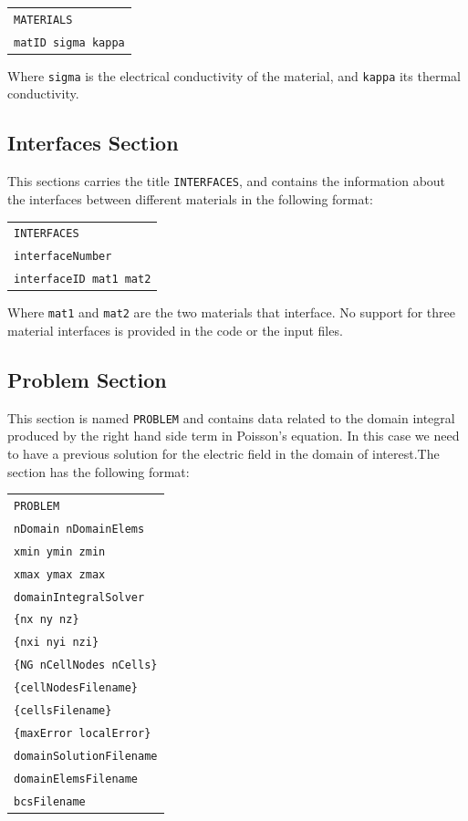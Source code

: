 \documentclass[12pt]{article}
\begin{document}
\begin{tabular}{l}
\texttt{MATERIALS}\\
\texttt{matID sigma kappa}
\end{tabular}

Where \verb+sigma+ is the electrical conductivity of the material, and \verb+kappa+ its thermal conductivity.

\subsection{Interfaces Section}
This sections carries the title \verb+INTERFACES+, and contains the information about the interfaces between different materials in the following format:

\begin{tabular}{l}
\texttt{INTERFACES}\\
\texttt{interfaceNumber}\\
\texttt{interfaceID mat1 mat2}\\
\end{tabular}

Where \verb+mat1+ and \verb+mat2+ are the two materials that interface. No support for three material interfaces is provided in the code or the input files.

\subsection{Problem Section}
This section is named \verb+PROBLEM+ and contains data related to the domain integral produced by the right hand side term in Poisson's equation. In this case we need to have a previous solution for the electric field in the domain of interest.The section has the following format:

\begin{tabular}{l}
\texttt{PROBLEM}\\
\texttt{nDomain nDomainElems}\\
\texttt{xmin ymin zmin}\\
\texttt{xmax ymax zmax}\\
\texttt{domainIntegralSolver}\\
\texttt{\{nx  ny  nz\}}\\
\texttt{\{nxi nyi nzi\}}\\
\texttt{\{NG nCellNodes nCells\}}\\
\texttt{\{cellNodesFilename\}}\\
\texttt{\{cellsFilename\}}\\
\texttt{\{maxError localError\}}\\
\texttt{domainSolutionFilename}\\
\texttt{domainElemsFilename}\\
\texttt{bcsFilename}
\end{tabular}
\end{document}
